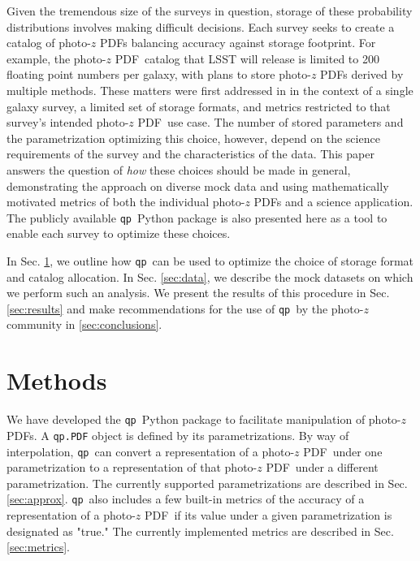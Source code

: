 \documentclass[\docopts]{\docclass}
\newcommand{\qp}{\texttt{qp}}
\newcommand{\pz}{photo-$z$ PDF}
\begin{document}
Given the tremendous size of the surveys in question, storage of these 
probability distributions involves making difficult decisions.  Each survey 
seeks to create a catalog of \pz s balancing accuracy against storage 
footprint.  For example, the \pz\ catalog that LSST will release is limited to 
200 floating point numbers per galaxy, with plans to store \pz s derived by 
multiple methods.    These matters were first 
addressed in \citet{carrasco_kind_sparse_2014} in the context of a single 
galaxy survey, a limited set of storage formats, and metrics restricted to that 
survey's intended \pz\ use case.  The number of stored parameters and the 
parametrization optimizing this choice, however, depend on the science 
requirements of the survey and the characteristics of the data.  This paper 
answers the question of \textit{how} these choices should be made in general, 
demonstrating the approach on diverse mock data and using mathematically 
motivated metrics of both the individual \pz s and a science application.  The 
publicly available \qp\ Python package is also presented here as a tool to 
enable each survey to optimize these choices.

In Sec. \ref{sec:methods}, we outline how \qp\ can be used to optimize the 
choice of storage format and catalog allocation.  In Sec. \ref{sec:data}, we 
describe the mock datasets on which we perform such an analysis.  We present 
the results of this procedure in Sec. \ref{sec:results} and make 
recommendations for the use of \qp\ by the photo-$z$ community in 
\ref{sec:conclusions}.








\section{Methods}
\label{sec:methods}



We have developed the \qp\ Python package to facilitate manipulation of \pz s.  
A \texttt{qp.PDF} object is defined by its parametrizations.  By way of 
interpolation, \qp\ can convert a representation of a \pz\ under one 
parametrization to a representation of that \pz\ under a different 
parametrization.  The currently supported parametrizations are described in 
Sec. \ref{sec:approx}.  \qp\ also includes a few built-in metrics of the 
accuracy of a representation of a \pz\ if its value under a given 
parametrization is designated as "true."  The currently implemented metrics are 
described in Sec. \ref{sec:metrics}.
\end{document}
